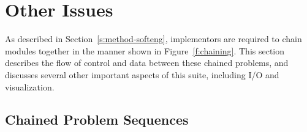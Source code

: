 \section{Other Issues\label{s:issues}}

As described in Section~\ref{s:method-softeng},
implementors are required to chain modules together in the manner shown in Figure~\ref{f:chaining}.
This section describes the flow of control and data between these chained problems,
and discusses several other important aspects of this suite,
including I/O and visualization.

\subsection{Chained Problem Sequences\label{s:issues-chain}}

